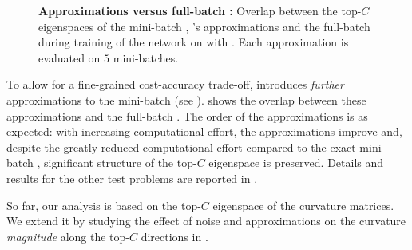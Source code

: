 %

\begin{figure}[t]
  \centering
  
  \tikzexternalenable
  
  \tikzexternaldisable

  \caption{ \textbf{Approximations versus full-batch \ggn{}:} Overlap between the
    top-$C$ eigenspaces of the mini-batch \ggn{}, \vivit{}'s approximations and
    the full-batch \ggn during training of the \threecthreed network on \cifarten
    with \sgd{}. Each approximation is evaluated on $5$ mini-batches.
  } \label{vivit::fig:approx_eigenspace_vivit}
\end{figure}

To allow for a fine-grained cost-accuracy trade-off, \vivit introduces
\textit{further} approximations to the mini-batch \ggn{} (see
). 
shows the overlap between these \ggn approximations and the full-batch
\ggn{}. The order of the approximations
is as expected: with increasing computational effort, the approximations improve
and, despite the greatly reduced computational effort compared to the exact
mini-batch \ggn{}, significant structure of the top-$C$ eigenspace is preserved.
Details and results for the other test problems are reported in
.

So far, our analysis is based on the top-$C$ eigenspace of the curvature
matrices. We extend it by studying the effect of noise and approximations on the
curvature \textit{magnitude} along the top-$C$ directions in
.

